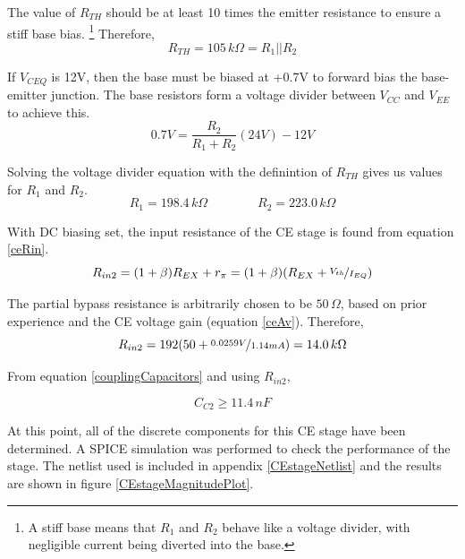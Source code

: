 \documentclass[titlepage, letterpaper, 11pt]{article}
\begin{document}
The value of $R_{TH}$ should be at least 10 times the emitter
resistance to ensure a stiff base bias. \footnote{A stiff base means
that $R_{1}$ and $R_{2}$ behave like a voltage divider, with 
negligible current being diverted into the base.} Therefore,
\begin{equation*}
R_{TH}=105\,k\Omega=R_{1}||R_{2}
\end{equation*}

If $V_{CEQ}$ is 12V, then the base must be biased at +0.7V to forward
bias the base-emitter junction. The base resistors form a voltage
divider between $V_{CC}$ and $V_{EE}$ to achieve this.
\begin{equation*}
0.7V=\frac{R_{2}}{R_{1}+R_{2}}(24V)-12V
\end{equation*}

Solving the voltage divider equation with the definintion of $R_{TH}$
gives us values for $R_{1}$ and $R_{2}$.
\begin{equation*}
R_{1}=198.4\,k\Omega\qquad\qquad R_{2}=223.0\,k\Omega
\end{equation*}

With DC biasing set, the input resistance of the CE stage is found
from equation \ref{ceRin}.
\begin{equation*}
R_{in2}=(1+\beta)R_{EX}+r_{\pi}=
(1+\beta)(R_{EX}+\nicefrac{V_{th}}{I_{EQ}})
\end{equation*}

The partial bypass resistance is arbitrarily chosen to be
$50\,\Omega$, based on prior experience and the CE voltage gain
(equation \ref{ceAv}). Therefore,
\begin{equation*}
R_{in2}=192(50+\nicefrac{0.0259V}{1.14mA})=14.0\,k\Omega
\end{equation*}

From equation \ref{couplingCapacitors} and using $R_{in2}$,

\begin{equation*}
C_{C2}\geq 11.4\,nF
\end{equation*}

At this point, all of the discrete components for this CE stage have
been determined. A SPICE simulation was performed to check the
performance of the stage. The netlist used is included
in appendix \ref{CEstageNetlist} and the results are shown in figure
\ref{CEstageMagnitudePlot}.
\end{document}
